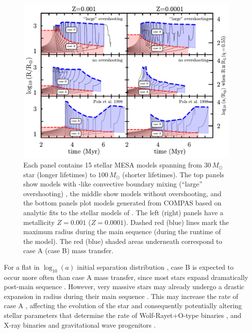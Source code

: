\documentclass[twocolumn]{aastex63}
\begin{document}
\begin{figure}[htbp]
  \centering
  \includegraphics[width=1.0\textwidth]{radii}
  \caption{Each panel contains 15 stellar \textsc{MESA} models spanning
    from $30 \, M_{\odot}$ star (longer lifetimes) to
    $100 \, M_{\odot}$ (shorter lifetimes). The top panels show models
    with \cite{brott:11}-like convective boundary mixing (``large''
    overshooting) \citep{claret:18}, the middle show models without
    overshooting, and the bottom panels plot models generated from
    \textsc{COMPAS} based on analytic fits to the stellar models of
    \cite{pols:98}. The left (right) panels have a metallicity
    $Z=0.001$ ($Z=0.0001$). Dashed red (blue) lines mark the maximum
    radius during the main sequence (during the runtime of the
    model). The red (blue) shaded areas underneath correspond to case
    A (case B) mass transfer.}
  \label{fig:radii}
\end{figure}


For a flat in $\log_{10}(a)$ initial separation distribution
\citep{opik:24}, case B is expected to occur more often than case A
mass transfer, since most stars expand dramatically post-main sequence
\citep[e.g.,][]{vandenheuvel:69}. However, very massive stars may
already undergo a drastic expansion in radius during their main
sequence \citep[e.g.,][]{sanyal:15, jiang:15}. This may increase the
rate of case A \citep{demink:08}, affecting the evolution of the star
and consequently potentially altering stellar parameters that
determine the rate of Wolf-Rayet+O-type binaries
\citep[e.g.,][]{nuijten:24}, and X-ray binaries and gravitational wave
progenitors \citep[e.g.,][]{mandel:22}.
\end{document}
